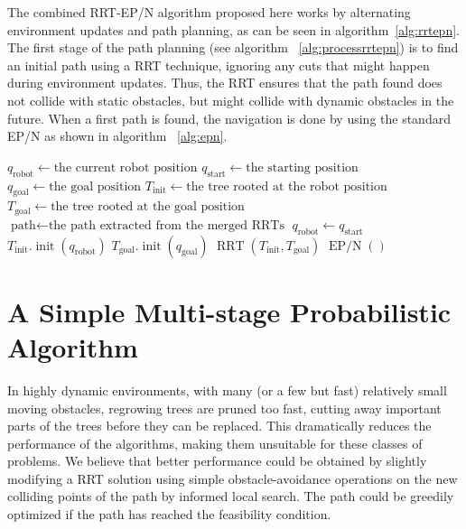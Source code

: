 The combined RRT-EP/N algorithm proposed here works by alternating environment
updates and path planning, as can be seen in
algorithm~\ref{alg:rrtepn}. The first stage of the path planning (see algorithm~%
\ref{alg:processrrtepn})
is to find an initial path using a RRT technique, ignoring any cuts that might happen during
environment updates. Thus, the RRT ensures that the path found
does not collide with static obstacles, but might collide with dynamic obstacles in the future.
When a first path is found,
the navigation is done by using the standard EP/N as shown in algorithm~%
\ref{alg:epn}.

\begin{algorithm}[ht]
    \caption{$\operatorname{processRRTEPN}(time)$}
    \label{alg:processrrtepn}
    \begin{algorithmic}[1]
        \STATE \(q_{\text{robot}} \leftarrow \text{the current robot position}\)
        \STATE \(q_{\text{start}} \leftarrow \text{the starting position}\)
        \STATE \(q_{\text{goal}} \leftarrow \text{the goal position}\)
        \STATE \(T_{\text{init}} \leftarrow \text{the tree rooted at the robot position}\)
        \STATE \(T_{\text{goal}} \leftarrow \text{the tree rooted at the goal position}\)
        \STATE \(\text{path} \leftarrow \text{the path extracted from the merged RRTs}\)
        \STATE \(q_{\text{robot}} \leftarrow q_{\text{start}}\)
        \STATE \(T_{\text{init}}.\operatorname{init}(q_{\text{robot}})\)
        \STATE \(T_{\text{goal}}.\operatorname{init}(q_{\text{goal}})\)
                \STATE \(\operatorname{RRT}(T_{\text{init}},T_{\text{goal}})\)
            \ELSE
                \STATE \(\operatorname{EP/N}()\)
            \ENDIF
        \ENDWHILE
    \end{algorithmic}
\end{algorithm}

\section{A Simple Multi-stage Probabilistic Algorithm}
\label{sec:RRT-LP}

In highly dynamic environments, with many (or a few but fast) relatively small
moving obstacles, regrowing trees are pruned too fast, cutting away important
parts of the trees before they can be replaced. This dramatically reduces
the performance of the algorithms, making them unsuitable for these classes
of problems.
We believe that better performance could be obtained
by slightly modifying a RRT solution using simple obstacle-avoidance
operations on the new colliding points of the path by informed local search.
The path could be greedily optimized if the path has reached the feasibility
condition.

